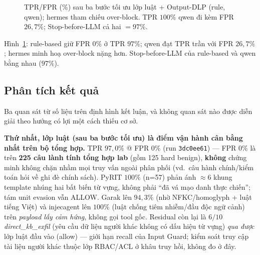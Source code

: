 \begin{figure}[H]
\centering
{}
\caption{TPR/FPR (\%) sau ba bước tối ưu lớp luật + Output-DLP (rule, qwen); hermes tham chiếu over-block. TPR $100\%$ qwen đi kèm FPR $26{,}7\%$; Stop-before-LLM cả hai $=97\%$.}
\label{fig:tpr-fpr-bar}
\end{figure}

Hình~\ref{fig:tpr-fpr-bar}: rule-based giữ FPR $0\%$ ở TPR $97\%$; qwen đạt
TPR trần với FPR $26{,}7\%$; hermes minh hoạ over-block nặng hơn. Stop-before-LLM
của rule-based và qwen bằng nhau ($97\%$).

\subsection{Phân tích kết quả}

Ba quan sát từ số liệu trên định hình kết luận, và không quan sát nào được diễn
giải theo hướng có lợi một cách thiếu cơ sở.

\textbf{Thứ nhất, lớp luật (sau ba bước tối ưu) là điểm vận hành cân bằng nhất
trên bộ tổng hợp.} TPR $97{,}0\%$ @ FPR $0\%$ (run \texttt{3dc0ee61}) --- FPR
$0\%$ là trên \textbf{225 câu lành tính tổng hợp lab} (gồm 125 hard benign),
\textbf{không} chứng minh không chặn nhầm mọi truy vấn ngoài phân phối (vd.\ câu
hành chính/kiểm toán hỏi về ghi đè chính sách). PyRIT $100\%$ (n=57) phản ánh
$\approx 6$ khung template nhúng hai bất biến từ vựng, không phải ``đã vá mạo danh
thực chiến''; tám unit evasion vẫn ALLOW. Garak lên $94{,}3\%$ (nhờ NFKC/homoglyph
+ luật tiếng Việt) và injecagent lên $100\%$ (luật chống tiêm nhiễm/đầu độc ngữ
cảnh) trên \emph{payload lấy cảm hứng}, không gọi tool gốc. Residual còn lại là
$6/10$ \emph{direct\_kb\_exfil} (yêu cầu dữ liệu người khác không có dấu hiệu từ
vựng) \emph{qua được} lớp luật đầu vào (allow) --- giới hạn recall của Input
Guard; kiểm soát truy cập tài liệu người khác thuộc lớp RBAC/ACL ở khâu truy hồi,
không đo ở đây.

